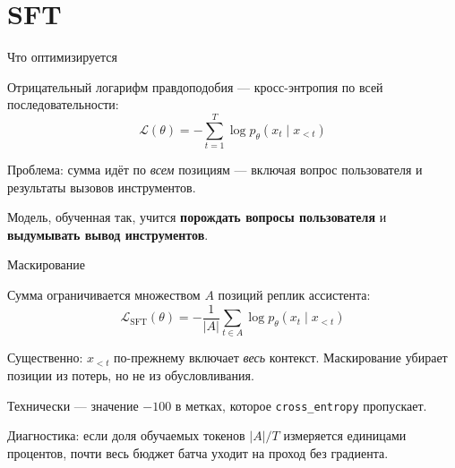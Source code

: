 \documentclass[11pt,aspectratio=169]{beamer}
\newcommand{\key}[1]{%
  \begin{center}\colorbox{boxbg}{\parbox{0.92\textwidth}{\vspace{2pt}#1\vspace{2pt}}}\end{center}}
\newcommand{\aside}[1]{{\color{dim}\small #1}}
\begin{document}
\section{SFT}

\begin{frame}{Что оптимизируется}

Отрицательный логарифм правдоподобия — кросс-энтропия по всей
последовательности:
\[
\mathcal{L}(\theta) = -\sum_{t=1}^{T} \log p_\theta(x_t \mid x_{<t})
\]

\vspace{0.5em}
Проблема: сумма идёт по \emph{всем} позициям — включая вопрос
пользователя и результаты вызовов инструментов.

\vspace{1em}
\key{Модель, обученная так, учится \textbf{порождать вопросы
пользователя} и \textbf{выдумывать вывод инструментов}.}

\end{frame}

\begin{frame}{Маскирование}

Сумма ограничивается множеством $A$ позиций реплик ассистента:
\[
\mathcal{L}_{\text{SFT}}(\theta) = -\frac{1}{|A|}\sum_{t \in A}
\log p_\theta(x_t \mid x_{<t})
\]

\vspace{1em}
Существенно: $x_{<t}$ по-прежнему включает \emph{весь} контекст.
Маскирование убирает позиции из потерь, но не из обусловливания.

\vspace{0.5em}
Технически — значение $-100$ в метках, которое \texttt{cross\_entropy}
пропускает.

\vspace{1em}
\aside{Диагностика: если доля обучаемых токенов $|A|/T$ измеряется
единицами процентов, почти весь бюджет батча уходит на проход без
градиента.}

\end{frame}
\end{document}
